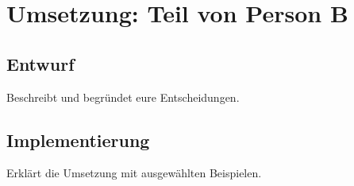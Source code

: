 \chapter{Umsetzung: Teil von Person B}
\section{Entwurf}
Beschreibt und begründet eure Entscheidungen.
\section{Implementierung}
Erklärt die Umsetzung mit ausgewählten Beispielen.
